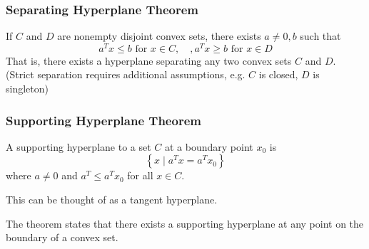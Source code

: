 \documentclass[11pt]{article}
\begin{document}
\subsubsection{Separating Hyperplane Theorem} 
If $C$ and $D$ are nonempty disjoint convex sets, there exists $a \neq 0, b$ such that 
\[ a^Tx \leq b \text{ for } x \in C, \quad, a^Tx \geq b \text{ for } x \in D \] 
That is, there exists a hyperplane separating any two convex sets $C$ and $D$. (Strict separation requires additional assumptions, e.g. $C$ is closed, $D$ is singleton)
\subsubsection*{Supporting Hyperplane Theorem} 
A supporting hyperplane to a set $C$ at a boundary point $x_0$ is 
\[ \left\{ x \mid a^Tx = a^Tx_0 \right\}  \] 
where $a \neq 0$ and $a^T \leq a^Tx_0$ for all $x \in C$. \par
This can be thought of as a tangent hyperplane. \par 
The theorem states that there exists a supporting hyperplane at any point on the boundary of a convex set. \par 
\end{document}
